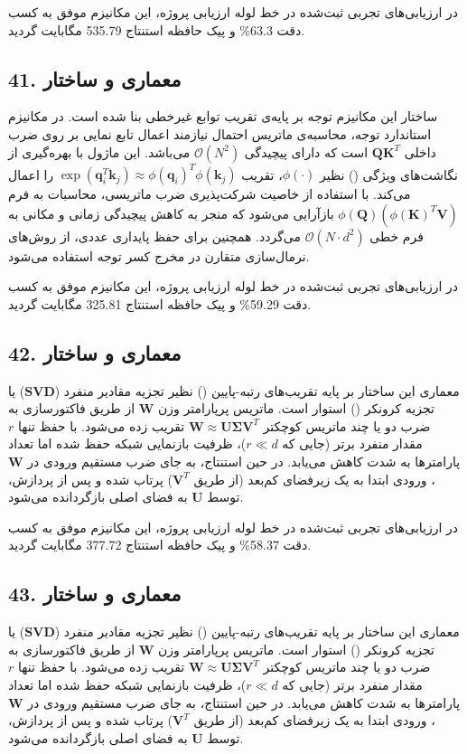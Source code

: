 \documentclass[12pt,a4paper]{report}
\theoremstyle{definition}
\begin{document}
در ارزیابی‌های تجربی ثبت‌شده در خط لوله ارزیابی پروژه، این مکانیزم موفق به کسب دقت 63.3\% و پیک حافظه استنتاج 535.79 مگابایت گردید.

\subsection*{41. معماری و ساختار }
ساختار این مکانیزم توجه بر پایه‌ی تقریب توابع غیرخطی بنا شده است. در مکانیزم استاندارد توجه، محاسبه‌ی ماتریس احتمال نیازمند اعمال تابع نمایی بر روی ضرب داخلی $\mathbf{Q} \mathbf{K}^T$ است که دارای پیچیدگی $\mathcal{O}(N^2)$ می‌باشد. این ماژول با بهره‌گیری از نگاشت‌های ویژگی () نظیر $\phi(\cdot)$، تقریب $\exp(\mathbf{q}_i^T \mathbf{k}_j) \approx \phi(\mathbf{q}_i)^T \phi(\mathbf{k}_j)$ را اعمال می‌کند. با استفاده از خاصیت شرکت‌پذیری ضرب ماتریسی، محاسبات به فرم $\phi(\mathbf{Q}) (\phi(\mathbf{K})^T \mathbf{V})$ بازآرایی می‌شود که منجر به کاهش پیچیدگی زمانی و مکانی به فرم خطی $\mathcal{O}(N \cdot d^2)$ می‌گردد. همچنین برای حفظ پایداری عددی، از روش‌های نرمال‌سازی متقارن در مخرج کسر توجه استفاده می‌شود.

در ارزیابی‌های تجربی ثبت‌شده در خط لوله ارزیابی پروژه، این مکانیزم موفق به کسب دقت 59.29\% و پیک حافظه استنتاج 325.81 مگابایت گردید.

\subsection*{42. معماری و ساختار }
معماری این ساختار بر پایه تقریب‌های رتبه-پایین () نظیر تجزیه مقادیر منفرد ($\mathbf{SVD}$) یا تجزیه کرونکر () استوار است. ماتریس پرپارامتر وزن $\mathbf{W}$ از طریق فاکتورسازی به ضرب دو یا چند ماتریس کوچکتر $\mathbf{W} \approx \mathbf{U} \mathbf{\Sigma} \mathbf{V}^T$ تقریب زده می‌شود. با حفظ تنها $r$ مقدار منفرد برتر (جایی که $r \ll d$)، ظرفیت بازنمایی شبکه حفظ شده اما تعداد پارامترها به شدت کاهش می‌یابد. در حین استنتاج، به جای ضرب مستقیم ورودی در $\mathbf{W}$، ورودی ابتدا به یک زیرفضای کم‌بعد (از طریق $\mathbf{V}^T$) پرتاب شده و پس از پردازش، توسط $\mathbf{U}$ به فضای اصلی بازگردانده می‌شود.

در ارزیابی‌های تجربی ثبت‌شده در خط لوله ارزیابی پروژه، این مکانیزم موفق به کسب دقت 58.37\% و پیک حافظه استنتاج 377.72 مگابایت گردید.

\subsection*{43. معماری و ساختار }
معماری این ساختار بر پایه تقریب‌های رتبه-پایین () نظیر تجزیه مقادیر منفرد ($\mathbf{SVD}$) یا تجزیه کرونکر () استوار است. ماتریس پرپارامتر وزن $\mathbf{W}$ از طریق فاکتورسازی به ضرب دو یا چند ماتریس کوچکتر $\mathbf{W} \approx \mathbf{U} \mathbf{\Sigma} \mathbf{V}^T$ تقریب زده می‌شود. با حفظ تنها $r$ مقدار منفرد برتر (جایی که $r \ll d$)، ظرفیت بازنمایی شبکه حفظ شده اما تعداد پارامترها به شدت کاهش می‌یابد. در حین استنتاج، به جای ضرب مستقیم ورودی در $\mathbf{W}$، ورودی ابتدا به یک زیرفضای کم‌بعد (از طریق $\mathbf{V}^T$) پرتاب شده و پس از پردازش، توسط $\mathbf{U}$ به فضای اصلی بازگردانده می‌شود.
\end{document}

